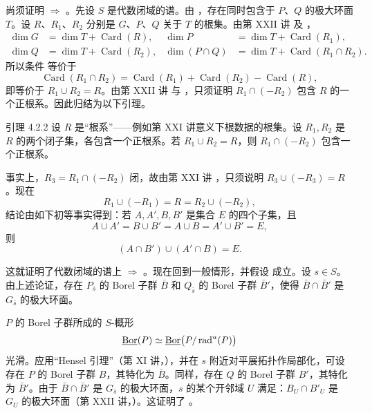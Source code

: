 尚须证明 \textup{} \(\Rightarrow\) \textup{}。先设 \(S\) 是代数闭域的谱。由 ，存在同时包含于 \(P\)、\(Q\) 的极大环面 \(T\)。设 \(R\)、\(R_1\)、\(R_2\) 分别是 \(G\)、\(P\)、\(Q\) 关于 \(T\) 的根集。由第 XXII 讲  及 ，
\[
\begin{aligned}
 \dim G&=\dim T+\operatorname{Card}(R),&
 \dim P&=\dim T+\operatorname{Card}(R_1),\\
 \dim Q&=\dim T+\operatorname{Card}(R_2),&
 \dim(P\cap Q)&=\dim T+\operatorname{Card}(R_1\cap R_2).
\end{aligned}
\]
所以条件 \textup{} 等价于
\[
 \operatorname{Card}(R_1\cap R_2)
 =\operatorname{Card}(R_1)+\operatorname{Card}(R_2)
  -\operatorname{Card}(R),
\]
即等价于 \(R_1\cup R_2=R\)。由第 XXII 讲  与 ，只须证明 \(R_1\cap(-R_2)\) 包含 \(R\) 的一个正根系。因此归结为以下引理。

\begin{sgastatement}{引理 4.2.2}
设 \(R\) 是“根系”——例如第 XXI 讲意义下根数据的根集。设 \(R_1,R_2\) 是 \(R\) 的两个闭子集，各包含一个正根系。若 \(R_1\cup R_2=R\)，则 \(R_1\cap(-R_2)\) 包含一个正根系。
\end{sgastatement}

事实上，\(R_3=R_1\cap(-R_2)\) 闭，故由第 XXI 讲 ，只须说明 \(R_3\cup(-R_3)=R\)。现在
\[
 R_1\cup(-R_1)=R=R_2\cup(-R_2),
\]
结论由如下初等事实得到：若 \(A,A',B,B'\) 是集合 \(E\) 的四个子集，且
\[
 A\cup A'=B\cup B'=A\cup B=A'\cup B'=E,
\]
则
\[
 (A\cap B')\cup(A'\cap B)=E.
\]

这就证明了代数闭域的谱上 \textup{} \(\Rightarrow\) \textup{}。现在回到一般情形，并假设 \textup{} 成立。设 \(s\in S\)。由上述论证，存在 \(P_{\bar s}\) 的 Borel 子群 \(\bar B\) 和 \(Q_{\bar s}\) 的 Borel 子群 \(\bar B'\)，使得 \(\bar B\cap\bar B'\) 是 \(G_{\bar s}\) 的极大环面。

\(P\) 的 Borel 子群所成的 \(S\)-概形
\[
 \underline{\operatorname{Bor}}(P)\simeq\underline{\operatorname{Bor}}\bigl(P/\operatorname{rad}^u(P)\bigr)
\]
光滑。应用“Hensel 引理”（第 XI 讲，），并在 \(s\) 附近对平展拓扑作局部化，可设存在 \(P\) 的 Borel 子群 \(B\)，其特化为 \(\bar B\)。同样，存在 \(Q\) 的 Borel 子群 \(B'\)，其特化为 \(\bar B'\)。由于 \(\bar B\cap\bar B'\) 是 \(G_{\bar s}\) 的极大环面，\(s\) 的某个开邻域 \(U\) 满足：\(B_U\cap B'_U\) 是 \(G_U\) 的极大环面（第 XXII 讲，）。这证明了 \textup{}。
\SGAQED

